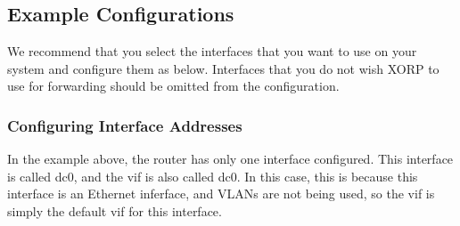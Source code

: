 \newpage
\subsection{Example Configurations}

We recommend that you select the interfaces that you want to use on
your system and configure them as below.  Interfaces that you do not
wish XORP to use for forwarding should be omitted from the
configuration.

\subsubsection{Configuring Interface Addresses}

\vspace{0.1in}
\noindent{}

\vspace{0.1in}
In the example above, the router has only one interface configured.
This interface is called {\stt dc0}, and the vif is also called {\stt
dc0}.  In this case, this is because this interface is an Ethernet
inferface, and VLANs are not being used, so the vif is simply the
default vif for this interface.  

